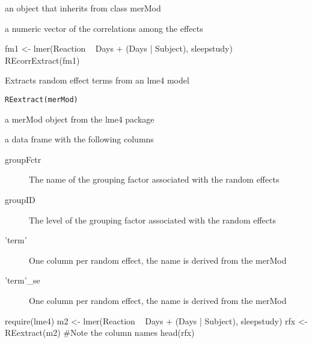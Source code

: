 \documentclass[letterpaper]{book}
\begin{document}
%
\begin{Arguments}
\begin{ldescription}
\item[\code{model}] an object that inherits from class merMod
\end{ldescription}
\end{Arguments}
%
\begin{Value}
a numeric vector of the correlations among the effects
\end{Value}
%
\begin{Examples}
\begin{ExampleCode}
fm1 <- lmer(Reaction ~ Days + (Days | Subject), sleepstudy)
REcorrExtract(fm1)
\end{ExampleCode}
\end{Examples}
%
\begin{Description}\relax
Extracts random effect terms from an lme4 model
\end{Description}
%
\begin{Usage}
\begin{verbatim}
REextract(merMod)
\end{verbatim}
\end{Usage}
%
\begin{Arguments}
\begin{ldescription}
\item[\code{merMod}] a merMod object from the lme4 package
\end{ldescription}
\end{Arguments}
%
\begin{Value}
a data frame with the following columns
\begin{description}

\item[groupFctr] The name of the grouping factor associated with the random effects
\item[groupID] The level of the grouping factor associated with the random effects
\item['term'] One column per random effect, the name is derived from the merMod
\item['term'\_se] One column per random effect, the name is derived from the merMod

\end{description}

\end{Value}
%
\begin{Examples}
\begin{ExampleCode}
require(lme4)
m2 <- lmer(Reaction ~ Days + (Days | Subject), sleepstudy)
rfx <- REextract(m2)
#Note the column names
head(rfx)
\end{ExampleCode}
\end{Examples}
\end{document}
